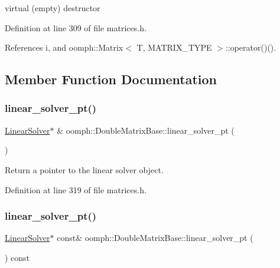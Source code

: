 virtual (empty) destructor 



Definition at line 309 of file matrices.\+h.



References i, and oomph\+::\+Matrix$<$ T, M\+A\+T\+R\+I\+X\+\_\+\+T\+Y\+P\+E $>$\+::operator()().



\subsection{Member Function Documentation}
\mbox{\label{classoomph_1_1DoubleMatrixBase_a0469ef03089f7f216931940305c38194}} 
\subsubsection{\texorpdfstring{linear\+\_\+solver\+\_\+pt()}{linear\_solver\_pt()}\hspace{0.1cm}{\footnotesize\ttfamily [1/2]}}
{\footnotesize\ttfamily \hyperlink{classoomph_1_1LinearSolver}{Linear\+Solver}$\ast$ \& oomph\+::\+Double\+Matrix\+Base\+::linear\+\_\+solver\+\_\+pt (\begin{DoxyParamCaption}{ }\end{DoxyParamCaption})\hspace{0.3cm}{\ttfamily [inline]}}



Return a pointer to the linear solver object. 



Definition at line 319 of file matrices.\+h.

\mbox{\label{classoomph_1_1DoubleMatrixBase_af3a865cc9920a2fe7d895b638667be18}} 
\subsubsection{\texorpdfstring{linear\+\_\+solver\+\_\+pt()}{linear\_solver\_pt()}\hspace{0.1cm}{\footnotesize\ttfamily [2/2]}}
{\footnotesize\ttfamily \hyperlink{classoomph_1_1LinearSolver}{Linear\+Solver}$\ast$ const\& oomph\+::\+Double\+Matrix\+Base\+::linear\+\_\+solver\+\_\+pt (\begin{DoxyParamCaption}{ }\end{DoxyParamCaption}) const\hspace{0.3cm}{\ttfamily [inline]}}



